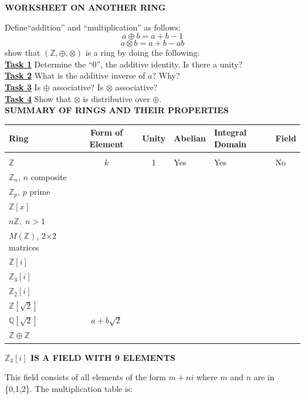 \documentclass[12pt, fleqn, twoside]{book}
\makeatletter
\def\cleardoublepage{\clearpage\if@twoside \ifodd\c@page\else
   \hbox{}\thispagestyle{empty}\newpage\if@twocolumn\hbox{}\newpage\fi\fi\fi}
\makeatother
\begin{document}
%
%
%
\cleardoublepage
%
%
%
{\large \bf 	WORKSHEET ON ANOTHER RING}\\[.25in]
Define``addition'' and ``multiplication'' as follows:
$$ a\oplus b = a+b-1 $$
$$ a\otimes b = a+b-ab$$
show that $(\mathbb{Z},\oplus, \otimes)$ is a ring by doing the following:\\[.25in]
\underline{\bf{Task 1}} Determine the ``0'', the additive identity.  Is there a unity?\\ \vfill
\underline{\bf{Task 2}} What is the additive inverse of $a$?  Why?\\ \vfill
\underline{\bf{Task 3}} Is $\oplus$ associative?  Is $\otimes$ associative?\\ \vfill
\underline{\bf{Task 4}} Show that $\otimes$ is distributive over $\oplus$.\\ \vfill
%
%
%
\cleardoublepage
%
%
%
{\large \bf 	SUMMARY OF RINGS AND THEIR PROPERTIES}\\[.25in]
\begin{tabular}{l|c|c|l|l|l}
Ring & Form of Element & Unity & Abelian & Integral Domain & Field\\
\hline
&&&&\\[-.1in]
$\mathbb{Z}$ & $k$ & 1 & Yes & Yes & No\\[.5in]
$\mathbb{Z}_n$, $n$ composite &&&&\\[.5in]
$\mathbb{Z}_p$, $p$ prime &&&&\\[.5in]
$\mathbb{Z}[x]$ &&&&\\[.5in]
$n\mathbb{Z}, \; n>1$ &&&&\\[.5in]
$M(\mathbb{Z})$, 2$\times$2 matrices &&&&\\[.5in]
$\mathbb{Z}[i]$ &&&&\\[.5in]
$\mathbb{Z}_3[i]$ &&&&\\[.5in]
$\mathbb{Z}_2[i]$ &&&&\\[.5in]
$\mathbb{Z}[\sqrt{2}] $&&&&\\[.5in]
$\mathbb{Q}[\sqrt{2}]$ & $a+b\sqrt{2}$ &&&\\[.5in]
$\mathbb{Z}\oplus \mathbb{Z}$ &&&&
\end{tabular}
%
%
%
\cleardoublepage
%
%
%
{\large \bf 	$\mathbb{Z}_3[i]$ IS A FIELD WITH 9 ELEMENTS}\\[.25in]
This field consists of all elements of the form $m+ni$ where $m$ and $n$ are in \{0,1,2\}.  The multiplication table is:\\[.25in]
\end{document}
